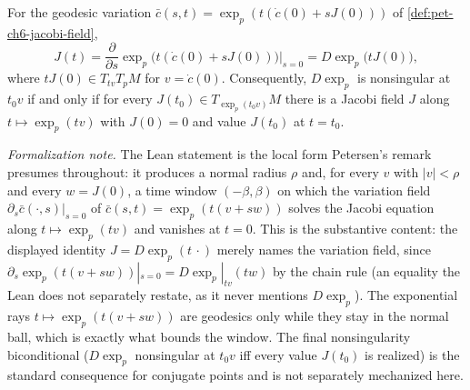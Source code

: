 \begin{remark}
  \label{rem:pet-ch6-jacobi-dexp-relation}
  \leanok
  For the geodesic variation $\bar c(s,t)=\exp_p(t(\dot c(0)+sJ(0)))$ of
  \cref{def:pet-ch6-jacobi-field},
  \[
    J(t)=\frac{\partial}{\partial s}\exp_p\big(t(\dot c(0)+sJ(0))\big)\Big|_{s=0}
    =D\exp_p\big(tJ(0)\big),
  \]
  where $tJ(0)\in T_{tv}T_pM$ for $v=\dot c(0)$. Consequently, $D\exp_p$ is
  nonsingular at $t_0v$ if and only if for every $J(t_0)\in
  T_{\exp_p(t_0v)}M$ there is a Jacobi field $J$ along $t\mapsto\exp_p(tv)$
  with $J(0)=0$ and value $J(t_0)$ at $t=t_0$.

  \emph{Formalization note.} The Lean statement is the local form Petersen's
  remark presumes throughout: it produces a normal radius $\rho$ and, for every
  $v$ with $\lvert v\rvert<\rho$ and every $w=J(0)$, a time window $(-\beta,\beta)$
  on which the variation field $\partial_s\bar c(\cdot,s)|_{s=0}$ of
  $\bar c(s,t)=\exp_p(t(v+sw))$ solves the Jacobi equation along
  $t\mapsto\exp_p(tv)$ and vanishes at $t=0$. This is the substantive content: the
  displayed identity $J=D\exp_p(t\,\cdot)$ merely names the variation field, since
  $\partial_s\exp_p(t(v+sw))|_{s=0}=D\exp_p|_{tv}(tw)$ by the chain rule (an
  equality the Lean does not separately restate, as it never mentions $D\exp_p$).
  The exponential rays $t\mapsto\exp_p(t(v+sw))$ are geodesics only while they stay
  in the normal ball, which is exactly what bounds the window. The final
  nonsingularity biconditional ($D\exp_p$ nonsingular at $t_0v$ iff every value
  $J(t_0)$ is realized) is the standard consequence for conjugate points and is not
  separately mechanized here.
\end{remark}

